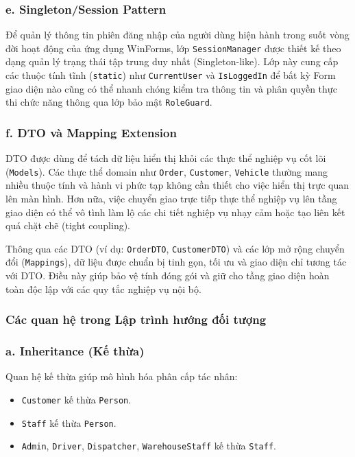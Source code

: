 \documentclass[12pt,a4paper]{article}
\begin{document}
\subsubsection*{e. Singleton/Session Pattern}

Để quản lý thông tin phiên đăng nhập của người dùng hiện hành trong suốt vòng đời hoạt động của ứng dụng WinForms, lớp \texttt{SessionManager} được thiết kế theo dạng quản lý trạng thái tập trung duy nhất (Singleton-like). Lớp này cung cấp các thuộc tính tĩnh (\texttt{static}) như \texttt{CurrentUser} và \texttt{IsLoggedIn} để bất kỳ Form giao diện nào cũng có thể nhanh chóng kiểm tra thông tin và phân quyền thực thi chức năng thông qua lớp bảo mật \texttt{RoleGuard}.

\subsubsection*{f. DTO và Mapping Extension}

DTO được dùng để tách dữ liệu hiển thị khỏi các thực thể nghiệp vụ cốt lõi (\texttt{Models}). Các thực thể domain như \texttt{Order}, \texttt{Customer}, \texttt{Vehicle} thường mang nhiều thuộc tính và hành vi phức tạp không cần thiết cho việc hiển thị trực quan lên màn hình. Hơn nữa, việc chuyển giao trực tiếp thực thể nghiệp vụ lên tầng giao diện có thể vô tình làm lộ các chi tiết nghiệp vụ nhạy cảm hoặc tạo liên kết quá chặt chẽ (tight coupling). 

Thông qua các DTO (ví dụ: \texttt{OrderDTO}, \texttt{CustomerDTO}) và các lớp mở rộng chuyển đổi (\texttt{Mappings}), dữ liệu được chuẩn bị tinh gọn, tối ưu và giao diện chỉ tương tác với DTO. Điều này giúp bảo vệ tính đóng gói và giữ cho tầng giao diện hoàn toàn độc lập với các quy tắc nghiệp vụ nội bộ.

\subsubsection{Các quan hệ trong Lập trình hướng đối tượng}

\subsubsection*{a. Inheritance (Kế thừa)}

Quan hệ kế thừa giúp mô hình hóa phân cấp tác nhân:

\begin{itemize}[leftmargin=1.2cm]
    \item \texttt{Customer} kế thừa \texttt{Person}.
    \item \texttt{Staff} kế thừa \texttt{Person}.
    \item \texttt{Admin}, \texttt{Driver}, \texttt{Dispatcher}, \texttt{WarehouseStaff} kế thừa \texttt{Staff}.
\end{itemize}
\end{document}
